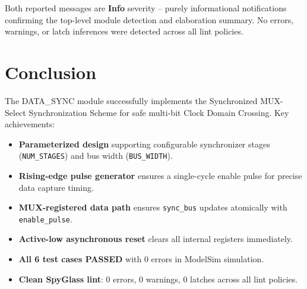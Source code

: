 \documentclass[12pt,a4paper]{article}
\begin{document}
Both reported messages are \textbf{Info} severity -- purely informational notifications confirming the top-level module detection and elaboration summary. No errors, warnings, or latch inferences were detected across all lint policies.

\section{Conclusion}

The DATA\_SYNC module successfully implements the Synchronized MUX-Select Synchronization Scheme for safe multi-bit Clock Domain Crossing. Key achievements:

\begin{itemize}
    \item \textbf{Parameterized design} supporting configurable synchronizer stages (\texttt{NUM\_STAGES}) and bus width (\texttt{BUS\_WIDTH}).
    \item \textbf{Rising-edge pulse generator} ensures a single-cycle enable pulse for precise data capture timing.
    \item \textbf{MUX-registered data path} ensures \texttt{sync\_bus} updates atomically with \texttt{enable\_pulse}.
    \item \textbf{Active-low asynchronous reset} clears all internal registers immediately.
    \item \textbf{All 6 test cases PASSED} with 0 errors in ModelSim simulation.
    \item \textbf{Clean SpyGlass lint}: 0 errors, 0 warnings, 0 latches across all lint policies.
\end{itemize}
\end{document}
